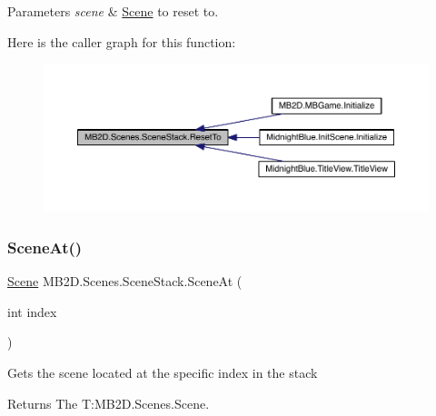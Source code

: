 \begin{DoxyParams}{Parameters}
{\em scene} & \hyperlink{class_m_b2_d_1_1_scenes_1_1_scene}{Scene} to reset to.\\
\hline
\end{DoxyParams}
Here is the caller graph for this function\+:
\nopagebreak
\begin{figure}[H]
\begin{center}
\leavevmode
\includegraphics[width=350pt]{class_m_b2_d_1_1_scenes_1_1_scene_stack_a521a38426d3e85caeb53b2909b623562_icgraph}
\end{center}
\end{figure}
\hypertarget{class_m_b2_d_1_1_scenes_1_1_scene_stack_a84b1a5b2771f6c663eece04bcafd5416}{}\label{class_m_b2_d_1_1_scenes_1_1_scene_stack_a84b1a5b2771f6c663eece04bcafd5416} 
\subsubsection{\texorpdfstring{Scene\+At()}{SceneAt()}}
{\footnotesize\ttfamily \hyperlink{class_m_b2_d_1_1_scenes_1_1_scene}{Scene} M\+B2\+D.\+Scenes.\+Scene\+Stack.\+Scene\+At (\begin{DoxyParamCaption}\item[{int}]{index }\end{DoxyParamCaption})\hspace{0.3cm}{\ttfamily [inline]}}



Gets the scene located at the specific index in the stack 

\begin{DoxyReturn}{Returns}
The T\+:\+M\+B2\+D.\+Scenes.\+Scene.
\end{DoxyReturn}

